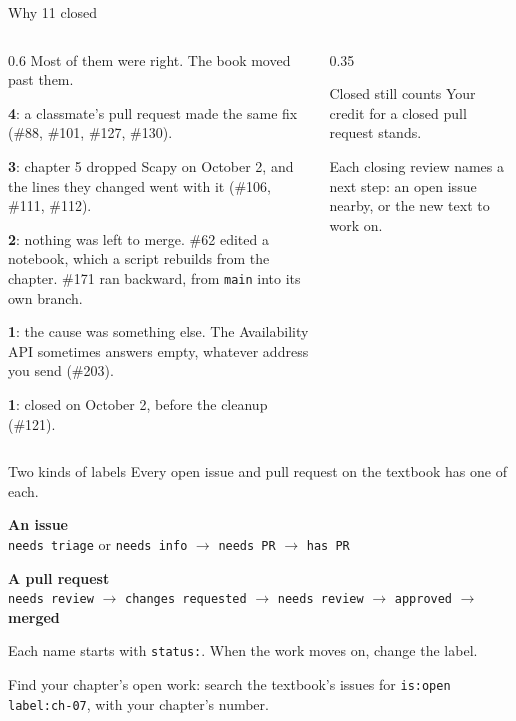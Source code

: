 \documentclass[9pt,aspectratio=169]{beamer}
\begin{document}
\begin{frame}{Why 11 closed}
    \begin{columns}[T]
        \begin{column}{0.6\textwidth}
            Most of them were right. The book moved past them.

            \medskip

            \textbf{4}: a classmate's pull request made the same fix (\#88, \#101, \#127, \#130).

            \medskip

            \textbf{3}: chapter 5 dropped Scapy on October 2, and the lines they changed went with it (\#106, \#111, \#112).

            \medskip

            \textbf{2}: nothing was left to merge. \#62 edited a notebook, which a script rebuilds from the chapter. \#171 ran backward, from \texttt{main} into its own branch.

            \medskip

            \textbf{1}: the cause was something else. The Availability API sometimes answers empty, whatever address you send (\#203).

            \medskip

            \textbf{1}: closed on October 2, before the cleanup (\#121).
        \end{column}
        \begin{column}{0.35\textwidth}
            \begin{alertblock}{Closed still counts}
                \small Your credit for a closed pull request stands.

                \medskip

                Each closing review names a next step: an open issue nearby, or the new text to work on.
            \end{alertblock}
        \end{column}
    \end{columns}
\end{frame}

\begin{frame}{Two kinds of labels}
    Every open issue and pull request on the textbook has one of each.

    \medskip

    \small
    \textbf{An issue}\\
    \texttt{needs triage} or \texttt{needs info} 
    $\to$ \texttt{needs PR} $\to$ \texttt{has PR}

    \medskip

    \textbf{A pull request}\\
    \texttt{needs review} $\to$ \texttt{changes requested} 
    $\to$ \texttt{needs review} $\to$ \texttt{approved} $\to$ \textbf{merged}

    \medskip
    Each name starts with \texttt{status:}. When the work moves on, change the label.

    \medskip

    Find your chapter's open work: search the textbook's issues for \texttt{is:open label:ch-07}, with your chapter's number.
\end{frame}
\end{document}
